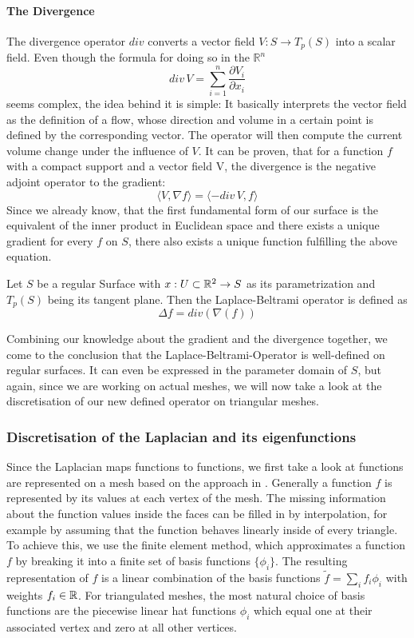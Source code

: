 \paragraph{The Divergence}
The divergence operator $div$ converts a vector field $V: S \rightarrow T_p(S)$ into a scalar field.
Even though the formula for doing so in the $\mathbb{R}^n$
\begin{equation}
	div\, V = \sum_{i=1}^{n} \frac{\partial V_i}{\partial x_i}
\end{equation}
seems complex, the idea behind it is simple:
It basically interprets the vector field as the definition of a flow, whose direction and volume in a certain point is defined by the corresponding vector.
The operator will then compute the current volume change under the influence of $V$.
It can be proven, that for a function $f$ with a compact support and a vector field V, the divergence is the negative adjoint operator to the gradient:\cite{polymesh}
\begin{equation}
	\langle V, \nabla f \rangle = \langle -div\, V, f \rangle
\end{equation}
Since we already know, that the first fundamental form of our surface is the equivalent of the inner product in Euclidean space and there exists a unique gradient for every $f$ on $S$, there also exists a unique function fulfilling the above equation.

\begin{mydef}
	Let $S$ be a regular Surface with $x:U\subset\mathbb{R}^2 \rightarrow S$ as its parametrization and $T_p(S)$ being its tangent plane.
	Then the Laplace-Beltrami operator is defined as
	$$\Delta f = div(\nabla(f))$$
\end{mydef}
Combining our knowledge about the gradient and the divergence together, we come to the conclusion that the Laplace-Beltrami-Operator is well-defined on regular surfaces.
It can even be expressed in the parameter domain of $S$, but again, since we are working on actual meshes, we will now take a look at the discretisation of our new defined operator on triangular meshes.

\subsubsection{Discretisation of the Laplacian and its eigenfunctions}
Since the Laplacian maps functions to functions, we first take a look at functions are represented on a mesh based on the approach in \cite{discretelaplacian2011}.
Generally a function $f$ is represented by its values at each vertex of the mesh.
The missing information about the function values inside the faces can be filled in by interpolation, for example by assuming that the function behaves linearly inside of every triangle.
To achieve this, we use the finite element method, which approximates a function $f$ by breaking it into a finite set of basis functions $\{\phi_i\}$.
The resulting representation of $f$ is a linear combination of the basis functions $\tilde{f} = \sum_i f_i \phi_i$ with weights $f_i \in \mathbb{R}$.
For triangulated meshes, the most natural choice of basis functions are the piecewise linear hat functions $\phi_i$ which equal one at their associated vertex and zero at all other vertices.

